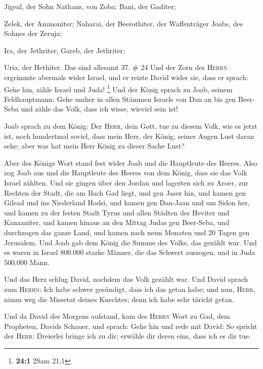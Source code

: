  Jigeal, der Sohn Nathans, von Zoba; Bani, der Gaditer;

 Zelek, der Ammoniter; Naharai, der Beerothiter, der
Waffenträger Joabs, des Sohnes der Zeruja;

 Ira, der Jethriter; Gareb, der Jethriter;

 Uria, der Hethiter. Das sind allesamt 37. \# 24
 Und der Zorn des \textsc{Herrn} ergrimmte abermals wider
Israel, und er reizte David wider sie, dass er sprach: Gehe hin, zähle
Israel und Juda! \footnote{\textbf{24:1} 2Sam 21,1}  Und
der König sprach zu Joab, seinem Feldhauptmann: Gehe umher in allen
Stämmen Israels von Dan an bis gen Beer-Seba und zähle das Volk, dass
ich wisse, wieviel sein ist!

 Joab sprach zu dem König: Der \textsc{Herr}, dein Gott,
tue zu diesem Volk, wie es jetzt ist, noch hundertmal soviel, dass mein
Herr, der König, seiner Augen Lust daran sehe; aber was hat mein Herr
König zu dieser Sache Lust?

 Aber des Königs Wort stand fest wider Joab und die
Hauptleute des Heeres. Also zog Joab aus und die Hauptleute des Heeres
von dem König, dass sie das Volk Israel zählten.  Und sie
gingen über den Jordan und lagerten sich zu Aroer, zur Rechten der
Stadt, die am Bach Gad liegt, und gen Jaser hin,  und
kamen gen Gilead und ins Niederland Hodsi, und kamen gen Dan-Jaan und um
Sidon her,  und kamen zu der festen Stadt Tyrus und allen
Städten der Heviter und Kanaaniter, und kamen hinaus an den Mittag Judas
gen Beer-Seba,  und durchzogen das ganze Land, und kamen
nach neun Monaten und 20 Tagen gen Jerusalem.  Und Joab
gab dem König die Summe des Volks, das gezählt war. Und es waren in
Israel 800.000 starke Männer, die das Schwert auszogen, und in Juda
500.000 Mann.

 Und das Herz schlug David, nachdem das Volk gezählt war.
Und David sprach zum \textsc{Herrn}: Ich habe schwer gesündigt, dass ich
das getan habe; und nun, \textsc{Herr}, nimm weg die Missetat deines
Knechtes; denn ich habe sehr töricht getan.

 Und da David des Morgens aufstand, kam des
\textsc{Herrn} Wort zu Gad, dem Propheten, Davids Schauer, und sprach:
 Gehe hin und rede mit David: So spricht der
\textsc{Herr}: Dreierlei bringe ich zu dir; erwähle dir deren eins, dass
ich es dir tue.

